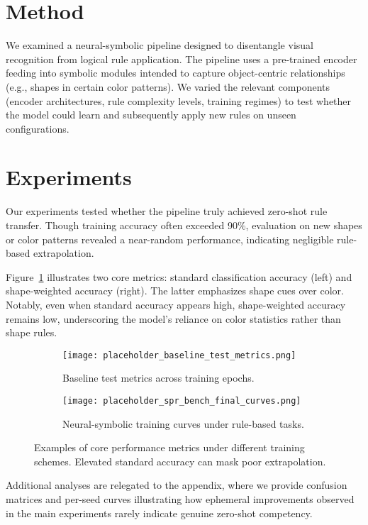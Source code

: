 \documentclass{article}
\begin{document}
\section{Method}
We examined a neural-symbolic pipeline designed to disentangle visual recognition from logical rule application. The pipeline uses a pre-trained encoder feeding into symbolic modules intended to capture object-centric relationships (e.g., shapes in certain color patterns). We varied the relevant components (encoder architectures, rule complexity levels, training regimes) to test whether the model could learn and subsequently apply new rules on unseen configurations.

\section{Experiments}
Our experiments tested whether the pipeline truly achieved zero-shot rule transfer. Though training accuracy often exceeded 90\%, evaluation on new shapes or color patterns revealed a near-random performance, indicating negligible rule-based extrapolation.

Figure~\ref{fig:combined} illustrates two core metrics: standard classification accuracy (left) and shape-weighted accuracy (right). The latter emphasizes shape cues over color. Notably, even when standard accuracy appears high, shape-weighted accuracy remains low, underscoring the model's reliance on color statistics rather than shape rules.

\begin{figure}[t]
\centering
\begin{subfigure}[b]{0.48\textwidth}
    \texttt{[image: placeholder\_baseline\_test\_metrics.png]}
    \caption{Baseline test metrics across training epochs.}
\end{subfigure}
\hfill
\begin{subfigure}[b]{0.48\textwidth}
    \texttt{[image: placeholder\_spr\_bench\_final\_curves.png]}
    \caption{Neural-symbolic training curves under rule-based tasks.}
\end{subfigure}
\caption{Examples of core performance metrics under different training schemes. Elevated standard accuracy can mask poor extrapolation.}
\label{fig:combined}
\end{figure}

Additional analyses are relegated to the appendix, where we provide confusion matrices and per-seed curves illustrating how ephemeral improvements observed in the main experiments rarely indicate genuine zero-shot competency.
\end{document}
